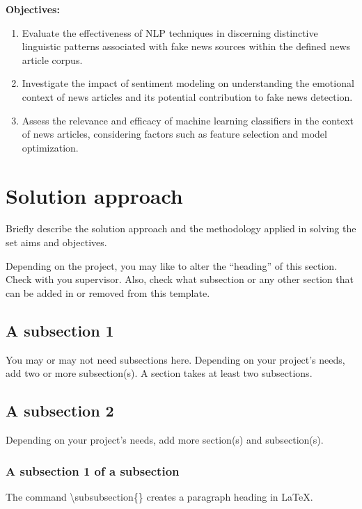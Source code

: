 \textbf{Objectives:} 
\begin{enumerate}
    \item Evaluate the effectiveness of NLP techniques in discerning distinctive linguistic patterns associated with fake news sources within the defined news article corpus.
    \item Investigate the impact of sentiment modeling on understanding the emotional context of news articles and its potential contribution to fake news detection.
    \item Assess the relevance and efficacy of machine learning classifiers in the context of news articles, considering factors such as feature selection and model optimization.
\end{enumerate}
 



\section{Solution approach}
\label{sec:intro_sol} %
Briefly describe the solution approach and the methodology applied in solving the set aims and objectives.

Depending on the project, you may like to alter the ``heading'' of this section. Check with you supervisor. Also, check what subsection or any other section that can be added in or removed from this template.

\subsection{A subsection 1}
\label{sec:intro_some_sub1}
You may or may not need subsections here. Depending on your project's needs, add two or more subsection(s). A section takes at least two subsections. 

\subsection{A subsection 2}
\label{sec:intro_some_sub2}
Depending on your project's needs, add more section(s) and subsection(s).

\subsubsection{A subsection 1 of a subsection}
\label{sec:intro_some_subsub1}
The command \textbackslash subsubsection\{\} creates a paragraph heading in \LaTeX.

